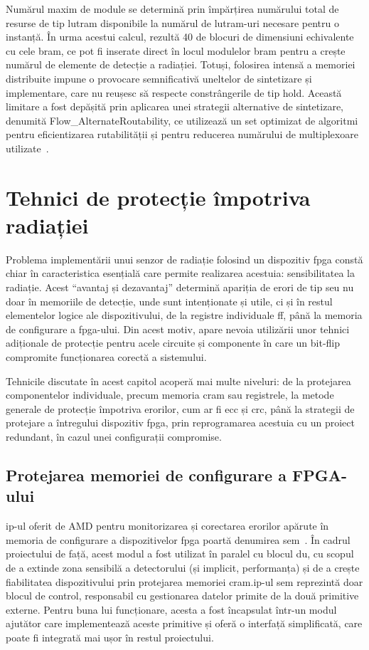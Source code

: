 \documentclass[12pt,a4paper]{report}
\begin{document}
Numărul maxim de module se determină prin împărțirea numărului total de resurse de tip \gls{lutram} disponibile la numărul de \gls{lutram}-uri necesare pentru o instanță. În urma acestui calcul, rezultă 40 de blocuri de dimensiuni echivalente cu cele \gls{bram}, ce pot fi inserate direct în locul modulelor \gls{bram} pentru a crește numărul de elemente de detecție a radiației. Totuși, folosirea intensă a memoriei distribuite impune o provocare semnificativă uneltelor de sintetizare și implementare, care nu reușesc să respecte constrângerile de tip hold. Această limitare a fost depășită prin aplicarea unei strategii alternative de sintetizare, denumită Flow\_AlternateRoutability, ce utilizează un set optimizat de algoritmi pentru eficientizarea rutabilității și pentru reducerea numărului de multiplexoare utilizate~\cite{ug901}.

\section{Tehnici de protecție împotriva radiației}
Problema implementării unui senzor de radiație folosind un dispozitiv \gls{fpga} constă chiar în caracteristica esențială care permite realizarea acestuia: sensibilitatea la radiație. Acest \enquote{avantaj și dezavantaj} determină apariția de erori de tip \gls{seu} nu doar în memoriile de detecție, unde sunt intenționate și utile, ci și în restul elementelor logice ale dispozitivului, de la registre individuale \gls{ff}, până la memoria de configurare a \gls{fpga}-ului. Din acest motiv, apare nevoia utilizării unor tehnici adiționale de protecție pentru acele circuite și componente în care un bit-flip compromite funcționarea corectă a sistemului.

Tehnicile discutate în acest capitol acoperă mai multe niveluri: de la protejarea componentelor individuale, precum memoria \gls{cram} sau registrele, la metode generale de protecție împotriva erorilor, cum ar fi \gls{ecc} și \gls{crc}, până la strategii de protejare a întregului dispozitiv \gls{fpga}, prin reprogramarea acestuia cu un proiect redundant, în cazul unei configurații compromise.

\subsection{Protejarea memoriei de configurare a FPGA-ului}%
\label{sem}
\gls{ip}-ul oferit de AMD pentru monitorizarea și corectarea erorilor apărute în memoria de configurare a dispozitivelor \gls{fpga} poartă denumirea \acrfull{sem}~\cite{pg036}. În cadrul proiectului de față, acest modul a fost utilizat în paralel cu blocul \gls{du}, cu scopul de a extinde zona sensibilă a detectorului (și implicit, performanța) și de a crește fiabilitatea dispozitivului prin protejarea memoriei \gls{cram}.\@ \gls{ip}-ul \gls{sem} reprezintă doar blocul de control, responsabil cu gestionarea datelor primite de la două primitive externe. Pentru buna lui funcționare, acesta a fost încapsulat într-un modul ajutător care implementează aceste primitive și oferă o interfață simplificată, care poate fi integrată mai ușor în restul proiectului.
\end{document}

